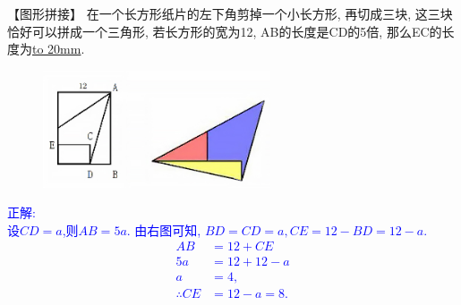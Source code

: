 \item {
    【图形拼接】
    在一个长方形纸片的左下角剪掉一个小长方形, 再切成三块,  这三块恰好可以拼成一个三角形, 若长方形的宽为12, AB的长度是CD的5倍, 那么EC的长度为\underline{\hbox to 20mm{}}.
    \begin{figure}[H] 
        \centering
        \includegraphics[width=0.6\textwidth]{./pics/Chapter_2/6.png}
    \end{figure}
    \ifshowSolution 
        \fangsong{}\textcolor{blue}{
            正解: \\
            设$CD=a$,则$AB=5a$.
            由右图可知, $BD=CD=a, CE = 12-BD = 12-a$.\\
            \begin{align*}
                AB &= 12+CE \\
                5a &= 12 + 12-a\\
                a &= 4,\\
                \therefore CE &= 12-a=8.
            \end{align*}
        }
    \else
        \vspace{1cm}
    \fi
}

